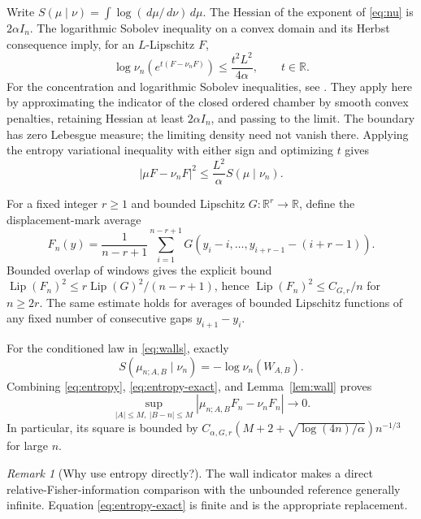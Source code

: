 \documentclass[11pt,reqno]{amsart}
\theoremstyle{definition}
\theoremstyle{remark}
\newtheorem{remark}[theorem]{Remark}
\newcommand{\R}{\mathbb R}
\newcommand{\1}{\mathbf 1}
\newcommand{\dd}{\,d}
\newcommand{\Lip}{\operatorname{Lip}}
\numberwithin{equation}{section}
\begin{document}
Write $S(\mu\mid\nu)=\int\log(\dd\mu/\dd\nu)\dd\mu$.
The Hessian of the exponent of \eqref{eq:nu} is $2\alpha I_n$.
The logarithmic Sobolev inequality on a convex domain and its Herbst
consequence imply, for an $L$-Lipschitz $F$,
\[
 \log\nu_n\!\left(e^{t(F-\nu_nF)}\right)
 \le\frac{t^2L^2}{4\alpha},\qquad t\in\R.
\]
For the concentration and logarithmic Sobolev inequalities, see
\cite{BGL}. They apply here by approximating the indicator of the
closed ordered chamber by smooth convex penalties, retaining Hessian
at least $2\alpha I_n$, and passing to the limit. The boundary has
zero Lebesgue measure; the limiting density need not vanish there. Applying the entropy variational inequality with either sign
and optimizing $t$ gives
\begin{equation}\label{eq:entropy}
 |\mu F-\nu_nF|^2\le\frac{L^2}{\alpha}S(\mu\mid\nu_n).
\end{equation}

For a fixed integer $r\ge1$ and bounded Lipschitz $G:\R^r\to\R$, define
the displacement-mark average
\begin{equation}\label{eq:mark-stat}
 F_n(y)=\frac1{n-r+1}\sum_{i=1}^{n-r+1}
 G(y_i-i,\ldots,y_{i+r-1}-(i+r-1)).
\end{equation}
Bounded overlap of windows gives the explicit bound
$\Lip(F_n)^2\le r\Lip(G)^2/(n-r+1)$, hence
$\Lip(F_n)^2\le C_{G,r}/n$ for $n\ge2r$. The same estimate holds for
averages of bounded Lipschitz functions of any fixed number of
consecutive gaps $y_{i+1}-y_i$.

For the conditioned law in \eqref{eq:walls}, exactly
\begin{equation}\label{eq:entropy-exact}
 S(\mu_{n;A,B}\mid\nu_n)=-\log\nu_n(W_{A,B}).
\end{equation}
Combining \eqref{eq:entropy}, \eqref{eq:entropy-exact}, and
Lemma~\ref{lem:wall} proves
\begin{equation}\label{eq:uniform-comparison}
 \sup_{|A|\le M,\ |B-n|\le M}
 |\mu_{n;A,B}F_n-\nu_nF_n|\longrightarrow0.
\end{equation}
In particular, its square is bounded by
$C_{\alpha,G,r}(M+2+\sqrt{\log(4n)/\alpha})n^{-1/3}$ for large $n$.

\begin{remark}[Why use entropy directly?]
The wall indicator makes a direct relative-Fisher-information comparison
with the unbounded reference generally infinite. Equation
\eqref{eq:entropy-exact} is finite and is the appropriate replacement.

\end{remark}
\end{document}

